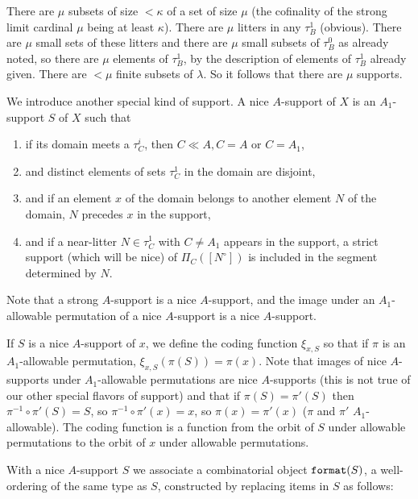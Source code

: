 \documentclass[12pt]{article}
\begin{document}
There are $\mu$ subsets of size $<\kappa$ of a set of size $\mu$ (the cofinality of the strong limit cardinal $\mu$ being at least $\kappa$).  There are $\mu$ litters
in any $\tau^1_B$ (obvious).  There are $\mu$ small sets of these litters and there are $\mu$ small subsets of $\tau^0_B$ as already noted, so there are $\mu$ elements of
$\tau^1_B$, by the description of elements of $\tau^1_B$ already given.  There are $<\mu$ finite subsets of $\lambda$.  So it follows that there are $\mu$ supports.

We introduce another special kind of support.  A nice $A$-support of $X$  is an $A_1$-support $S$ of $X$ such that 

\begin{enumerate}
\item if its domain meets a $\tau^i_C$, then $C\ll A, C= A$ or $C=A_1$,

\item and distinct elements of sets $\tau^1_C$ in the domain are disjoint,

\item and if an element $x$ of the domain belongs to another element $N$ of the domain, $N$ precedes $x$ in the support,

\item and if a near-litter $N \in \tau^1_C$ with $C \neq A_1$ appears in the support, a strict support (which will be nice) of $\Pi_C([N^{\circ}])$ is included in the segment determined by $N$.

\end{enumerate}

Note that a strong $A$-support is a nice $A$-support, and the image under an $A_1$-allowable permutation of a nice $A$-support is a nice $A$-support.

If $S$ is a nice $A$-support of $x$, we define the coding function $\xi_{x,S}$ so that if $\pi$ is an $A_1$-allowable permutation, $\xi_{x,S}(\pi(S)) = \pi(x)$.  Note that
images of nice $A$-supports under $A_1$-allowable permutations are nice $A$-supports (this is not true of our other special flavors of support)  and that if $\pi(S)=\pi'(S)$ then
$\pi^{-1}\circ \pi'(S)=S$, so $\pi^{-1}\circ \pi'(x) = x$, so $\pi(x)=\pi'(x)$ ($\pi$ and $\pi'$ $A_1$-allowable).  The coding function is a function from the orbit of $S$ under allowable permutations to the orbit of $x$
under allowable permutations.

With a nice $A$-support $S$ we associate a combinatorial object ${\tt format}(S)$, a well-ordering of the same type as $S$, constructed by replacing items in $S$ as follows:
\end{document}
